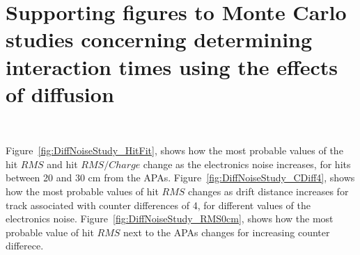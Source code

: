 \chapter{Supporting figures to Monte Carlo studies concerning determining interaction times using the effects of diffusion} ~\label{sec:DiffMCPlots}

\graphicspath{{Appendix1/Figs/PDF/}{Appendix1/Figs/Raster/}{Appendix1/Figs/Vector/}}

Figure~\ref{fig:DiffNoiseStudy_HitFit}, shows how the most probable values of the hit $RMS$ and hit $RMS/Charge$ change as the electronics noise increases, for hits between 20 and 30 cm from the APAs. Figure~\ref{fig:DiffNoiseStudy_CDiff4}, shows how the most probable values of hit $RMS$ changes as drift distance increases for track associated with counter differences of 4, for different values of the electronics noise. Figure~\ref{fig:DiffNoiseStudy_RMS0cm}, shows how the most probable value of hit $RMS$ next to the APAs changes for increasing counter differece. \\ 

